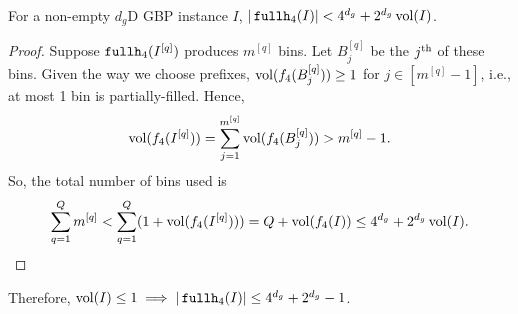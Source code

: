 \begin{lemma}
\label{lem:fh4}
For a non-empty $d_g$D GBP instance $I$, $|\fhk[4](I)| < 4^{d_g} + 2^{d_g}\vol(I)$.
\end{lemma}
\begin{proof}
Suppose $\fhk[4](I^{[q]})$ produces $m^{[q]}$ bins. Let $B_j^{[q]}$ be the $j\Th$ of these bins.
Given the way we choose prefixes, $\vol(f_4(B_j^{[q]})) \ge 1$ for $j \in [m^{[q]}-1]$,
i.e., at most 1 bin is partially-filled. Hence,
\[ \vol(f_4(I^{[q]})) = \sum_{j=1}^{m^{[q]}} \vol(f_4(B_j^{[q]})) > m^{[q]}-1. \]
So, the total number of bins used is
\[ \sum_{q=1}^Q m^{[q]} < \sum_{q=1}^Q (1 + \vol(f_4(I^{[q]})))
= Q + \vol(f_4(I)) \le 4^{d_g} + 2^{d_g}\vol(I). \qedhere \]
\end{proof}

Therefore, $\vol(I) \le 1 \implies |\fhk[4](I)| \le 4^{d_g} + 2^{d_g} - 1$.
